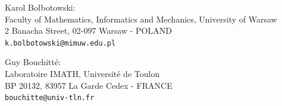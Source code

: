 \documentclass[11pt,reqno]{amsart}
\theoremstyle{definition}
\numberwithin{equation}{section}
\begin{document}
{\footnotesize

\noindent
Karol Bo{\l}botowski:\\
Faculty of Mathematics, Informatics and Mechanics, University of Warsaw\\
2 Banacha Street, 02-097 Warsaw - POLAND\\
{\tt k.bolbotowski@mimuw.edu.pl}

\medskip


\noindent
	Guy Bouchitt\'e:\\
	Laboratoire IMATH, Universit\'e de Toulon\\
	BP 20132, 83957 La Garde Cedex - FRANCE\\
	{\tt bouchitte@univ-tln.fr}
	
}
\end{document}
